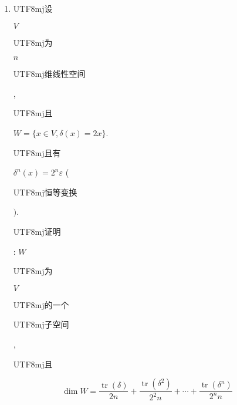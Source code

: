 \documentclass[10pt]{article}
\begin{document}
\begin{enumerate}
  \item \begin{CJK}{UTF8}{mj}设\end{CJK} $V$ \begin{CJK}{UTF8}{mj}为\end{CJK} $n$ \begin{CJK}{UTF8}{mj}维线性空间\end{CJK}, \begin{CJK}{UTF8}{mj}且\end{CJK} $W=\{x \in V, \delta(x)=2 x\}$. \begin{CJK}{UTF8}{mj}且有\end{CJK} $\delta^{n}(x)=2^{n} \varepsilon$ (\begin{CJK}{UTF8}{mj}恒等变换\end{CJK} $)$. \begin{CJK}{UTF8}{mj}证明\end{CJK}: $W$ \begin{CJK}{UTF8}{mj}为\end{CJK} $V$ \begin{CJK}{UTF8}{mj}的一个\end{CJK} \begin{CJK}{UTF8}{mj}子空间\end{CJK}, \begin{CJK}{UTF8}{mj}且\end{CJK}

\end{enumerate}
$$
\operatorname{dim} W=\frac{\operatorname{tr}(\delta)}{2 n}+\frac{\operatorname{tr}\left(\delta^{2}\right)}{2^{2} n}+\cdots+\frac{\operatorname{tr}\left(\delta^{n}\right)}{2^{n} n}
$$
\end{document}
